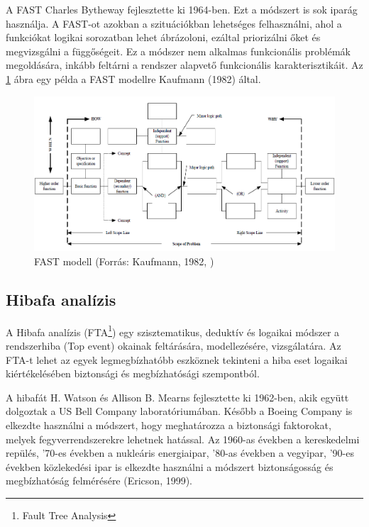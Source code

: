 A FAST Charles Bytheway fejlesztette ki 1964-ben. Ezt a módszert is sok iparág használja.
A FAST-ot azokban a szituációkban lehetséges felhasználni, ahol a funkciókat logikai sorozatban lehet ábrázoloni, ezáltal priorizálni őket és megvizsgálni a függőségeit.
Ez a módszer nem alkalmas funkcionális problémák megoldására, inkább feltárni a rendszer alapvető funkcionális karakterisztikáit.
Az \ref{fig:fast} ábra egy példa a FAST modellre Kaufmann (1982) által.

\begin{figure}
    \footnotesize
    \centering
    \includegraphics[width=150mm, keepaspectratio]{figures/fast.png}
    \caption{FAST modell (Forrás: Kaufmann, 1982, \cite{Kaufmann:1982})}
    \label{fig:fast}
\end{figure}

\subsection{Hibafa analízis}
A Hibafa analízis (FTA\footnote{Fault Tree Analysis}) egy szisztematikus, deduktív és logaikai módszer a rendszerhiba (Top event) okainak feltárására, modellezésére, vizsgálatára.
Az FTA-t lehet az egyek legmegbízhatóbb eszköznek tekinteni a hiba eset logaikai kiértékelésében biztonsági és megbízhatósági szempontból. \cite{Ericson}

A hibafát H. Watson és Allison B. Mearns fejlesztette ki 1962-ben, akik együtt dolgoztak a US Bell Company laboratóriumában. Később a Boeing Company is elkezdte használni a módszert, hogy meghatározza a biztonsági faktorokat, melyek fegyverrendszerekre lehetnek hatással.
Az 1960-as években a kereskedelmi repülés, '70-es években a nukleáris energiaipar, '80-as években a vegyipar, '90-es években közlekedési ipar is elkezdte használni a módszert biztonságosság és megbízhatóság felmérésére (Ericson, 1999).


